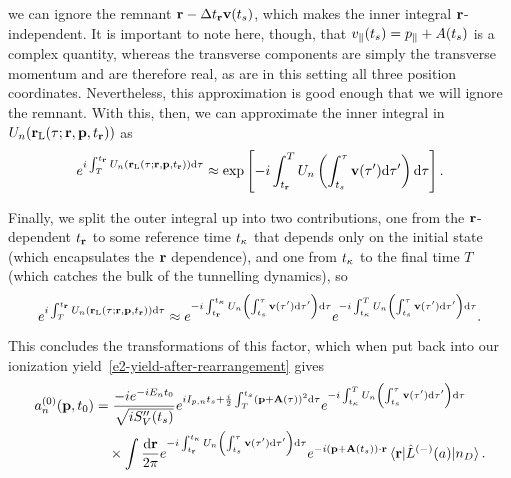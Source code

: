 we can ignore the remnant $\vb{r} - \Delta{t_{\ensuremath{\vb{r}}}} \vb{v}({t_s})$, which makes the inner integral $\vb{r}$-independent. It is important to note here, though, that ${v_{\parallel}}({t_s}) = {p_{\parallel}} + A({t_s})$ is a complex quantity, whereas the transverse components are simply the transverse momentum and are therefore real, as are in this setting all three position coordinates. Nevertheless, this approximation is good enough that we will ignore the remnant. With this, then, we can approximate the inner integral in $U_n(\vb{r}_\mathrm{L}(\tau;\vb{r},\vb{p},{t_{\vb{r}}}))$ as
\begin{equation}
e^{i\int_T^{t_{\vb{r}}} U_n(\vb{r}_\mathrm{L}(\tau;\vb{r},\vb{p},{t_{\vb{r}}}))\mathrm{d}\tau}
\approx 
\exp\left[{-i\int_{t_{\vb{r}}}^T U_n\left(\int_{ {t_s}}^\tau \vb{v}(\tau')\mathrm{d}\tau'\right) \mathrm{d}\tau}\right].
\end{equation}


Finally, we split the outer integral up into two contributions, one from the $\vb{r}$-dependent ${t_{\vb{r}}}$ to some reference time ${t_\kappa}$ that depends only on the initial state (which encapsulates the $\vb{r}$ dependence), and one from ${t_\kappa}$ to the final time $T$ (which catches the bulk of the tunnelling dynamics), so 
\begin{equation}
e^{i\int_T^{t_{\vb{r}}} U_n(\vb{r}_\mathrm{L}(\tau;\vb{r},\vb{p},{t_{\vb{r}}}))\mathrm{d}\tau}
\approx 
e^{-i\int_{t_{\vb{r}}}^{t_\kappa} U_n\left(\int_{ {t_s}}^\tau \vb{v}(\tau')\mathrm{d}\tau'\right) \mathrm{d}\tau}
e^{-i\int_{t_\kappa}^T U_n\left(\int_{ {t_s}}^\tau \vb{v}(\tau')\mathrm{d}\tau'\right) \mathrm{d}\tau}.
\end{equation}
This concludes the transformations of this factor, which when put back into our ionization yield~\eqref{e2-yield-after-rearrangement} gives 
\begin{align}
a_n^{(0)}(\vb{p},\tn)
& =
\frac{-i e^{-iE_n\tn}}{\sqrt{iS_V''(\ts)}}
e^{iI_{p,n} \ts + \frac{i}{2} \int_T^{\ts}\left(\vbp+\vba(\tau)\right)^2\d\tau }
e^{-i\int_\tk^T U_n\left(\int_{ \ts}^\tau \vb{v}(\tau')\d\tau'\right) \d\tau}
\nonumber \\ & \quad \times
\int\frac{\d\vbr}{2\pi}
e^{-i\int_\tvr^\tk U_n\left(\int_{ \ts}^\tau \vb{v}(\tau')\d\tau'\right) \d\tau}
e^{-i\left(\vbp+\vba(\ts)\right)\cdot\vb{r}}
\matrixel{\vbr}{\hat{L}^{(-)}(a)}{n_D}
.
\label{e2-ionization-yield-separated}
\end{align}


